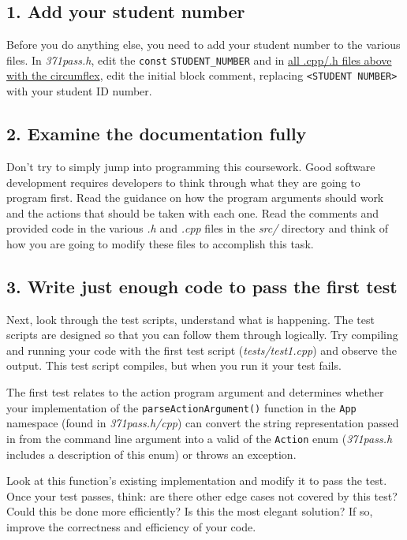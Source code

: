 \documentclass[a4paper]{article}
\begin{document}
\subsection*{1. Add your student number}\label{sec:tasks student-num}
Before you do anything else, you need to add your student number to the various files. In \emph{371pass.h}, edit the \texttt{const} \texttt{STUDENT\_NUMBER} and in \hyperref[sec:cwk dir]{all .cpp/.h files above with the circumflex}, edit the initial block comment, replacing \texttt{<STUDENT NUMBER>} with your student ID number.



\subsection*{2. Examine the documentation fully}\label{sec:tasks documentation}
Don't try to simply jump into programming this coursework. Good software development requires developers to think through what they are going to program first. Read the guidance on how the program arguments should work and the actions that should be taken with each one. Read the comments and provided code in the various \emph{.h} and \emph{.cpp} files in the \emph{src/} directory and think of how you are going to modify these files to accomplish this task.



\subsection*{3. Write just enough code to pass the first test}\label{sec:tasks first-test}
Next, look through the test scripts, understand what is happening. The test scripts are designed so that you can follow them through logically. Try compiling and running your code with the first test script (\emph{tests/test1.cpp}) and observe the output. This test script compiles, but when you run it your test fails.

The first test relates to the action program argument and determines whether your implementation of the \texttt{parseActionArgument()} function in the \texttt{App} namespace (found in \emph{371pass.h/cpp}) can convert the string representation passed in from the command line argument into a valid of the \texttt{Action} enum (\emph{371pass.h} includes a description of this enum) or throws an exception.

Look at this function's existing implementation and modify it to pass the test. Once your test passes, think: are there other edge cases not covered by this test? Could this be done more efficiently? Is this the most elegant solution? If so, improve the correctness and efficiency of your code.
\end{document}
